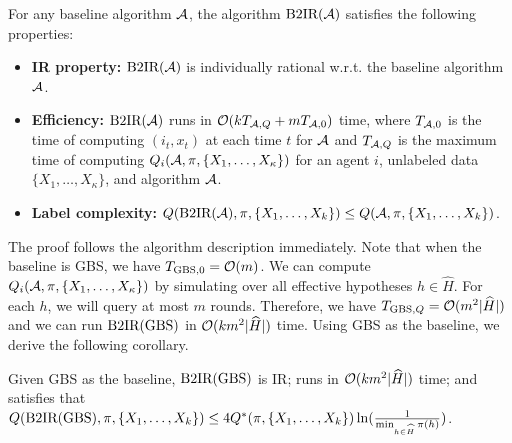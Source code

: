 \begin{theorem}\label{thm:ir}
    For any baseline algorithm $\mathcal{A}$, the algorithm $\textrm{B2IR}(\mathcal{A})$ satisfies the following properties:
    \begin{itemize}[topsep=0pt,itemsep =-0.5ex,  leftmargin = 6mm]
        \item \textbf{IR property:} $\textrm{B2IR}(\mathcal{A})$ is individually rational w.r.t. the baseline algorithm $\mathcal{A}$.
        \item \textbf{Efficiency:} $\textrm{B2IR}(\mathcal{A})$ runs in 
        $\mathcal{O}(k T_{\mathcal{A}, Q} + m T_{\mathcal{A},0})$ time, where $T_{\mathcal{A},0}$ is the time of computing $(i_t,x_t)$ at each time $t$ for $\mathcal{A}$ and $T_{\mathcal{A}, Q}$ is the maximum time of computing $Q_i(\mathcal{A},\pi,\{X_1,\ldots,X_\kappa\})$ for an  agent $i$, unlabeled data $\{X_1,\ldots,X_\kappa\}$, and algorithm $\mathcal{A}$.
        \item \textbf{Label complexity:} $Q(\textrm{B2IR}(\mathcal{A}), \pi,\{X_1,\ldots,X_k\})\leq Q(\mathcal{A}, \pi, \{X_1,\ldots,X_k\})$.
    \end{itemize} 
\end{theorem}
The proof follows the algorithm description immediately.
Note that when the baseline is GBS, we have $T_{\textrm{GBS},0} = \mathcal{O}(m)$. We can compute $Q_i(\mathcal{A},\pi,\{X_1,\ldots,X_\kappa\})$ by simulating over all effective hypotheses $h\in \hat H$. For each $h$, we will query at most $m$ rounds.
Therefore, we have $T_{\textrm{GBS},Q} = \mathcal{O}(m^2|\widehat H|)$ and we can run $\textrm{B2IR}(\textrm{GBS})$ in $\mathcal{O}(k m^2 |\widehat H|)$ time. 
Using GBS as the baseline, we derive the following corollary.
    
\begin{corollary}\label{crl:ir-greedy}
Given GBS as the baseline, $\textrm{B2IR}(\textrm{GBS})$ is IR; runs in $\mathcal{O}(k m^2 |\widehat H|)$ time; and satisfies that $Q(\textrm{B2IR}(\textrm{GBS}), \pi, \{X_1,\ldots,X_k\})\leq 4Q^*(\pi,\{X_1,\ldots,X_k\}) \ln(\frac{1}{\min_{h\in \widehat H} \pi(h)})$.
\end{corollary}






